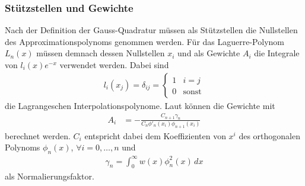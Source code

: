 \subsubsection{Stützstellen und Gewichte}
Nach der Definition der Gauss-Quadratur müssen als Stützstellen die Nullstellen
%
%
%
des Approximationspolynoms genommen werden.
Für das Laguerre-Polynom $L_n(x)$ müssen demnach dessen Nullstellen $x_i$ und
als Gewichte $A_i$ die Integrale von $l_i(x) e^{-x}$ verwendet werden.
%
Dabei sind
\begin{align*}
l_i(x_j)
=
\delta_{ij}
=
\begin{cases}
1 & i=j          \\
0 & \text{sonst}
\end{cases}
\end{align*}
die Lagrangeschen Interpolationspolynome.
%
Laut \cite{laguerre:hildebrand2013introduction} können die Gewichte mit
\begin{align*}
A_i
 & =
-\frac{C_{n+1} \gamma_n}{C_n \phi'_n(x_i) \phi_{n+1} (x_i)}
\end{align*}
berechnet werden.
$C_i$ entspricht dabei dem Koeffizienten von $x^i$
des orthogonalen Polynoms $\phi_n(x)$, $\forall i =0,\ldots,n$ und
\begin{align*}
\gamma_n
=
\int_0^\infty w(x) \phi_n^2(x)\,dx
\end{align*}
als Normalierungsfaktor.
%

